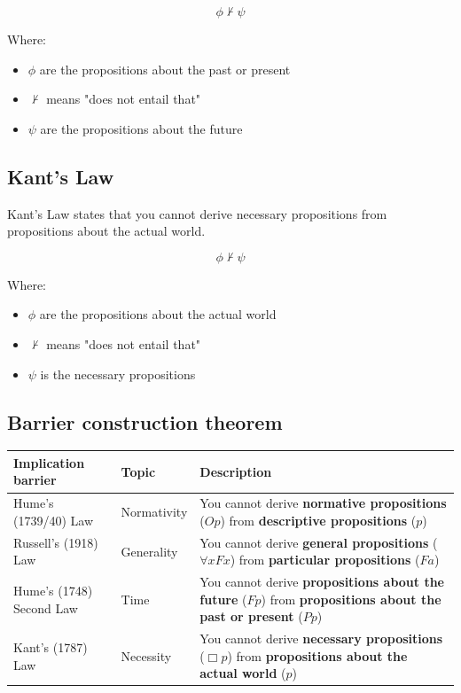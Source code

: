 \documentclass[11pt]{article}
\begin{document}
\[\phi \nvdash \psi\]

Where:
\begin{itemize}
\item \(\phi\) are the propositions about the past or present
\item \(\nvdash\) means "does not entail that"
\item \(\psi\) are the propositions about the future
\end{itemize}

 \newpage
\subsection{Kant's Law}
\label{sec:org681fc49}
Kant's Law states that you cannot derive necessary propositions from propositions about the actual world.

\[\phi \nvdash \psi\]

Where:
\begin{itemize}
\item \(\phi\) are the propositions about the actual world
\item \(\nvdash\) means "does not entail that"
\item \(\psi\) is the necessary propositions
\end{itemize}
\subsection{Barrier construction theorem}
\label{sec:org73998f9}
\begin{center}
\begin{tabularx}{\textwidth}{|X|X|X|}
\hline
Implication barrier & Topic & Description\\
\hline
Hume's (1739/40) Law & Normativity & You cannot derive \textbf{normative propositions} (\(Op\)) from \textbf{descriptive propositions} (\(p\))\\
\hline
Russell's (1918) Law & Generality & You cannot derive \textbf{general propositions} (\(\forall x F x\)) from \textbf{particular propositions} (\(Fa\))\\
\hline
Hume's (1748) Second Law & Time & You cannot derive \textbf{propositions about the future} (\(Fp\)) from \textbf{propositions about the past or present} (\(Pp\))\\
\hline
Kant's (1787) Law & Necessity & You cannot derive \textbf{necessary propositions} (\(\Box p\)) from \textbf{propositions about the actual world} (\(p\))\\
\hline
\end{tabularx}
\end{center}
\end{document}
